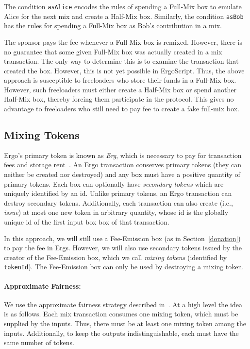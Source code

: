 \documentclass[runningheads]{llncs}
\newcommand{\langname}{ErgoScript\xspace}
\begin{document}
The condition \texttt{asAlice} encodes the rules of spending a Full-Mix box to emulate Alice for the next mix and create a Half-Mix box. Similarly, the condition \texttt{asBob} has the rules for spending a Full-Mix box as Bob's contribution in a mix. 

The sponsor pays the fee whenever a Full-Mix box is remixed. However, there is no guarantee that some given Full-Mix box was actually created in a mix transaction. The only way to determine this is to examine the transaction that created the box. However, this is not yet possible in \langname. Thus, the above approach is susceptible to freeloaders who store their funds in a Full-Mix box. However, such freeloaders must either create a Half-Mix box or spend another Half-Mix box, thereby forcing them participate in the protocol. This gives no advantage to freeloaders who still need to pay fee to create a fake full-mix box. 

\subsection{Mixing Tokens}

Ergo's primary token is known as {\em Erg}, which is necessary to pay for transaction fees and storage rent~\cite{chepurnoy2018systematic}. An Ergo transaction conserves primary tokens (they can neither be created nor destroyed) and any box must have a positive quantity of primary tokens.
Each box can optionally have {\em secondary tokens} which are uniquely identified by an id. Unlike primary tokens, an Ergo transaction can destroy secondary tokens. Additionally, each transaction can also create (i.e., {\em issue}) at most one new token in arbitrary quantity, whose id is the globally unique id of the first input box box of that transaction. 

In this approach, we will still use a Fee-Emission box (as in Section~\ref{donation}) to pay the fee in Ergs. However, we will also use secondary tokens issued by the creator of the Fee-Emission box, which we call {\em mixing tokens} (identified by \texttt{tokenId}). The Fee-Emission box can only be used by destroying a mixing token.

\paragraph{Approximate Fairness:} We use the approximate fairness strategy described in~\cite{advtutorial}. At a high level the idea is as follows.
Each mix transaction consumes one mixing token, which must be supplied by the inputs. Thus, there must be at least one mixing token among the inputs. Additionally, to keep the outputs indistinguishable, each must have the same number of tokens. 
\end{document}
